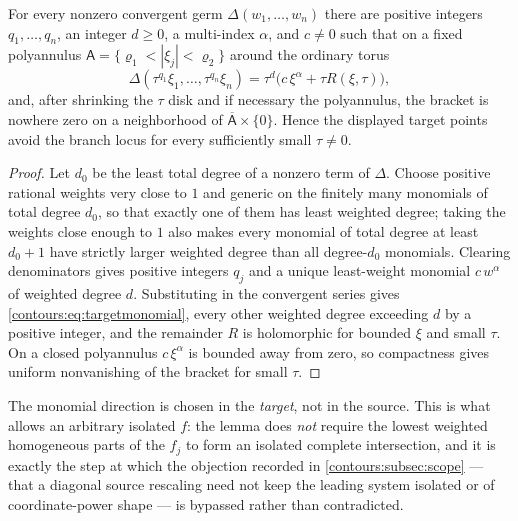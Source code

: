 \documentclass[11pt,letterpaper]{article}
\theoremstyle{definition}
\theoremstyle{remark}
\numberwithin{equation}{section}
\begin{document}
\begin{lemma}
\label{contours:lem:targetmonomial}
For every nonzero convergent germ $\Delta(w_1,\ldots,w_n)$ there are positive
integers $q_1,\ldots,q_n$, an integer $d\ge0$, a multi-index $\alpha$, and
$c\ne0$ such that on a fixed polyannulus
$\mathsf A=\{\varrho_1<|\xi_j|<\varrho_2\}$ around the ordinary torus
\begin{equation}\label{contours:eq:targetmonomial}
  \Delta(\tau^{q_1}\xi_1,\ldots,\tau^{q_n}\xi_n)
  =\tau^d\bigl(c\,\xi^\alpha+\tau R(\xi,\tau)\bigr),
\end{equation}
and, after shrinking the $\tau$ disk and if necessary the polyannulus, the
bracket is nowhere zero on a neighborhood of $\overline{\mathsf A}\times\{0\}$. Hence the
displayed target points avoid the branch locus for every sufficiently small
$\tau\ne0$.
\end{lemma}
\begin{proof}
Let $d_0$ be the least total degree of a nonzero term of $\Delta$. Choose
positive rational weights very close to $1$ and generic on the finitely many
monomials of total degree $d_0$, so that exactly one of them has least weighted
degree; taking the weights close enough to $1$ also makes every monomial of total
degree at least $d_0+1$ have strictly larger weighted degree than all
degree-$d_0$ monomials. Clearing denominators gives positive integers $q_j$ and a
unique least-weight monomial $c\,w^\alpha$ of weighted degree $d$. Substituting
in the convergent series gives \eqref{contours:eq:targetmonomial}, every other
weighted degree exceeding $d$ by a positive integer, and the remainder $R$ is
holomorphic for bounded $\xi$ and small $\tau$. On a closed polyannulus
$c\,\xi^\alpha$ is bounded away from zero, so compactness gives uniform
nonvanishing of the bracket for small $\tau$.
\end{proof}

The monomial direction is chosen in the \emph{target}, not in the source. This is
what allows an arbitrary isolated $f$: the lemma does \emph{not} require the
lowest weighted homogeneous parts of the $f_j$ to form an isolated complete
intersection, and it is exactly the step at which the objection recorded in
\cref{contours:subsec:scope} --- that a diagonal source rescaling need not keep
the leading system isolated or of coordinate-power shape --- is bypassed rather
than contradicted.
\end{document}
